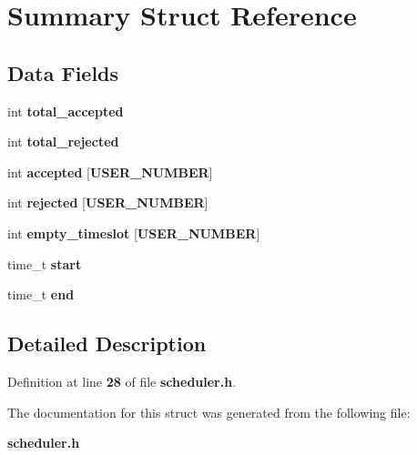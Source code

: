 \section{Summary Struct Reference}
\label{struct_summary}
\subsection*{Data Fields}
\begin{DoxyCompactItemize}
\item 
int {\bfseries total\+\_\+accepted}\label{struct_summary_a596d1da2837842b48f3a898a397698bd}

\item 
int {\bfseries total\+\_\+rejected}\label{struct_summary_a9e2beb39edf1a393dd256c89abdf4a14}

\item 
int {\bfseries accepted} [{\bf U\+S\+E\+R\+\_\+\+N\+U\+M\+B\+E\+R}]\label{struct_summary_a1132c4543b61ad455280a61b02d44962}

\item 
int {\bfseries rejected} [{\bf U\+S\+E\+R\+\_\+\+N\+U\+M\+B\+E\+R}]\label{struct_summary_a188091ffc3b85ad9af48f16c58e4733d}

\item 
int {\bfseries empty\+\_\+timeslot} [{\bf U\+S\+E\+R\+\_\+\+N\+U\+M\+B\+E\+R}]\label{struct_summary_a743f7ce40fa79552b29c84b9eb8ae83e}

\item 
time\+\_\+t {\bfseries start}\label{struct_summary_ada310e7f72b38fadd4b24d80ed3438ee}

\item 
time\+\_\+t {\bfseries end}\label{struct_summary_a13455ba845bf5d4dba37be491bc6a036}

\end{DoxyCompactItemize}


\subsection{Detailed Description}


Definition at line {\bf 28} of file {\bf scheduler.\+h}.



The documentation for this struct was generated from the following file\+:\begin{DoxyCompactItemize}
\item 
{\bf scheduler.\+h}\end{DoxyCompactItemize}
